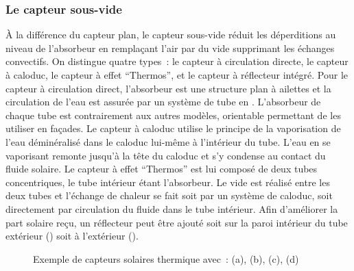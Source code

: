 \subsubsection{Le capteur sous-vide} %
\label{ssub:le_capteur_sous_vide}
À la différence du capteur plan, le capteur sous-vide réduit les déperditions
au niveau de l’absorbeur en remplaçant l’air par du vide supprimant les échanges
convectifs. On distingue quatre types~: le capteur à circulation directe,
le capteur à caloduc, le capteur à effet \enquote{Thermos}, et le capteur à
réflecteur intégré. Pour le capteur à circulation direct, l’absorbeur est une structure
plan à ailettes et la circulation de l’eau est assurée par un système de tube en .
L’absorbeur de chaque tube est contrairement aux autres modèles, orientable permettant
de les utiliser en façades. Le capteur à caloduc utilise le principe de la vaporisation
de l’eau déminéralisé dans le caloduc lui-même à l’intérieur du tube. L’eau en se vaporisant
remonte jusqu’à la tête du caloduc et s’y condense au contact du fluide solaire.
Le capteur à effet \enquote{Thermos} est lui composé de deux tubes concentriques,
le tube intérieur étant l’absorbeur. Le vide est réalisé entre les deux tubes et
l’échange de chaleur se fait soit par un système de caloduc, soit directement par
circulation du fluide dans le tube intérieur. Afin d’améliorer la part solaire reçu,
un réflecteur peut être ajouté soit sur la paroi intérieur du tube extérieur ()
soit à l’extérieur ().

\begin{figure}
    \centering
    \caption{Exemple de capteurs solaires thermique avec~: (a), (b), (c), (d)}
    \label{fig:image_panneaux_solaires}
\end{figure}


